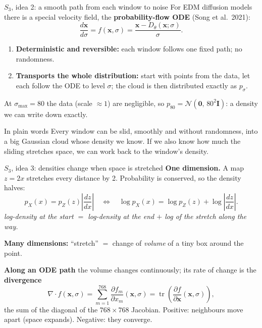 \documentclass[aspectratio=169,11pt]{beamer}
\DeclareMathOperator{\tr}{tr}
\newcommand{\x}{\bm{x}}
\begin{document}
\begin{frame}{$S_3$, idea 2: a smooth path from each window to noise}
\small
For EDM diffusion models there is a special velocity field, the \textbf{probability-flow ODE} (Song et al.\ 2021):
\[
\frac{d\x}{d\sigma}=f(\x,\sigma)=\frac{\x-D_\theta(\x;\sigma)}{\sigma}.
\]
\begin{enumerate}
\item \textbf{Deterministic and reversible:} each window follows one fixed path; no randomness.
\item \textbf{Transports the whole distribution:} start with points from the data, let each follow the ODE to level $\sigma$; the cloud is then distributed exactly as $p_\sigma$.
\end{enumerate}
At $\sigma_{\max}=80$ the data (scale $\approx1$) are negligible, so $p_{80}=\mathcal N(\bm 0,\,80^2\bm I)$: a density we can write down exactly.
\vspace{0.5em}
\begin{block}{In plain words}
Every window can be slid, smoothly and without randomness, into a big Gaussian cloud whose density we know. If we also know how much the sliding stretches space, we can work back to the window's density.
\end{block}
\end{frame}

\begin{frame}{$S_3$, idea 3: densities change when space is stretched}
\textbf{One dimension.} A map $z=2x$ stretches every distance by 2. Probability is conserved, so the density halves:
\[
p_X(x)=p_Z(z)\left|\frac{dz}{dx}\right|
\quad\Longleftrightarrow\quad
\log p_X(x)=\log p_Z(z)+\log\left|\frac{dz}{dx}\right|.
\]
\emph{log-density at the start $=$ log-density at the end $+$ log of the stretch along the way.}
\vspace{0.5em}

\textbf{Many dimensions:} ``stretch'' $=$ change of \emph{volume} of a tiny box around the point.
\vspace{0.5em}

\textbf{Along an ODE path} the volume changes continuously; its rate of change is the \textbf{divergence}
\[
\nabla\!\cdot f(\x,\sigma)=\sum_{m=1}^{768}\frac{\partial f_m}{\partial x_m}(\x,\sigma)=\tr\!\left(\frac{\partial f}{\partial\x}(\x,\sigma)\right),
\]
the sum of the diagonal of the $768\times768$ Jacobian. Positive: neighbours move apart (space expands). Negative: they converge.
\end{frame}
\end{document}
